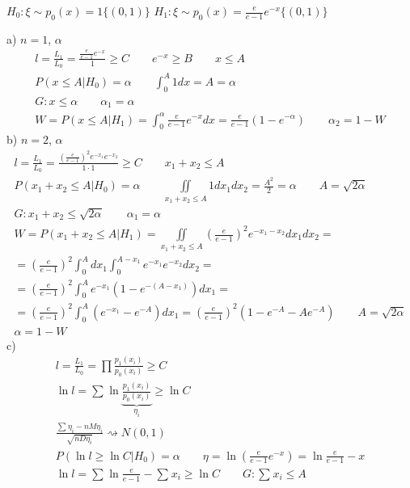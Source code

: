 \documentclass{article}
\begin{document}
\begin{eg}[Т11 из задания]
  $H_0: \xi \sim p_0(x)=1\{(0,1)\}$
  $H_1: \xi \sim p_0(x)=\frac{e}{e-1}e^{-x}\{(0,1)\}$

  \hr 
  a) $n=1$, $\alpha$
  \begin{gather*}
    l=\frac{L_1}{L_0}=\frac{\frac{e}{e-1}e^{-x}}{1} \ge C \qquad e^{-x} \ge B \qquad x \le A \\ 
    P(x \le A | H_0) = \alpha \qquad \int_{0}^{A}1dx=A=\alpha \\ 
    G: x \le \alpha \qquad \alpha_1= \alpha \\ 
    W=P(x \le A | H_1) = \int_{0}^{\alpha}\frac{e}{e-1}e^{-x}dx=\frac{e}{e-1}(1-e^{-\alpha}) \qquad \alpha_2=1-W
  \end{gather*}
  \hr 
  b) $n=2$, $\alpha$
  \begin{gather*}
    l = \frac{L_1}{L_0}=\frac{\left(\frac{e}{e-1}\right)^{2}e^{-x_1}e^{-x_2}}{1 \cdot 1} \ge C 
    \qquad x_1+x_2\le A \\ 
    P(x_1+x_2 \le A | H_0) =\alpha \qquad \iint\limits_{x_1+x_2 \le A}1dx_1dx_2=\frac{A^{2}}{2}=\alpha \qquad A=\sqrt{2\alpha}  \\ 
    G:x_1+x_2 \le \sqrt{2\alpha} \qquad \alpha_1=\alpha \\ 
    W=P(x_1 + x_2 \le A | H_1) =\iint\limits_{x_1+x_2 \le A} \left(\frac{e}{e-1}\right)^{2}e^{-x_1-x_2}dx_1dx_2=\\
    =\left(\frac{e}{e-1}\right)^{2}\int_{0}^{A}dx_1\int_{0}^{A-x_1}e^{-x_1}e^{-x_2}dx_2= \\ 
    =\left(\frac{e}{e-1}\right)^{2}\int_{0}^{A}e^{-x_1}(1-e^{-(A-x_1)})dx_1= \\ 
    =\left(\frac{e}{e-1}\right)^{2}\int_{0}^{A}(e^{-x_1}-e^{-A})dx_1 
    =\left(\frac{e}{e-1}\right)^{2}(1-e^{-A}-Ae^{-A}) \qquad A=\sqrt{2\alpha} \\ 
    \alpha=1-W
  \end{gather*}
  \hr
  c)
  \begin{gather*}
    l = \frac{L_1}{L_0} = \prod\frac{p_1(x_i)}{p_0(x_i)} \ge C \\ 
    \ln l = \sum_{}^{}\ln \underbrace{\frac{p_1(x_i)}{p_0(x_i)}}_{\eta_i} \ge \ln C \\ 
    \frac{\sum_{}^{}\eta_i-nM\eta_i}{\sqrt{nD\eta_i}} \rightsquigarrow N(0,1) \\ 
    P(\ln l \ge \ln C|H_0) = \alpha \qquad \eta=\ln(\frac{e}{e-1}e^{-x})=\ln \frac{e}{e-1}-x \\ 
    \ln l = \sum_{}^{}\ln \frac{e}{e-1}-\sum_{}^{}x_i \ge \ln C \qquad G:\sum_{}^{}x_i \le A \\ 

\end{gather*}
\end{eg}
\end{document}
